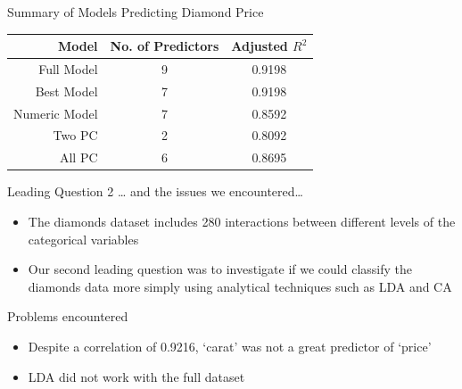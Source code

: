 \documentclass[
  ignorenonframetext,
]{beamer}
\providecommand{\tightlist}{%
  \setlength{\itemsep}{0pt}\setlength{\parskip}{0pt}}
\begin{document}
\begin{frame}{Summary of Models Predicting Diamond Price}
\protect\hypertarget{summary-of-models-predicting-diamond-price}{}
\begin{table}[ht]
\centering
\begin{tabular}{rcc}
  \hline
 Model \vline & No. of Predictors & Adjusted $R^2$ \\ 
  \hline
Full Model \vline & 9 & 0.9198\\
   \hline
Best Model \vline & 7 & 0.9198\\
\hline
Numeric Model \vline & 7 & 0.8592\\
Two PC \vline & 2 & 0.8092\\
All PC \vline & 6 & 0.8695\\
\end{tabular}
\end{table}
\end{frame}

\begin{frame}{Leading Question 2 \ldots{} and the issues we
encountered\ldots{}}
\protect\hypertarget{leading-question-2-and-the-issues-we-encountered}{}
\begin{itemize}
\tightlist
\item
  The diamonds dataset includes 280 interactions between different
  levels of the categorical variables\linebreak
\item
  Our second leading question was to investigate if we could classify
  the diamonds data more simply using analytical techniques such as LDA
  and CA\linebreak 
\end{itemize}
\end{frame}

\begin{frame}{Problems encountered}
\protect\hypertarget{problems-encountered}{}
\begin{itemize}
\item
  Despite a correlation of 0.9216, `carat' was not a great predictor of
  `price'
\item
  LDA did not work with the full dataset
\end{itemize}
\end{frame}
\end{document}
